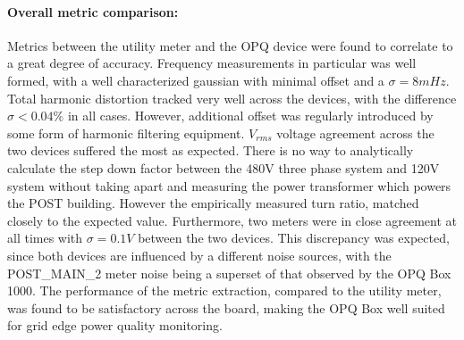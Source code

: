 \paragraph{Overall metric comparison:}
Metrics between the utility meter and the OPQ device were found to correlate to a great degree of accuracy.
Frequency measurements in particular was well formed, with a well characterized gaussian with minimal offset and a $\sigma =8mHz$.
Total harmonic distortion tracked very well across the devices, with the difference $\sigma < 0.04\%$ in all cases.
However, additional offset was regularly introduced by some form of harmonic filtering equipment.
$V_{rms}$ voltage agreement across the two devices suffered the most as expected.
There is no way to analytically calculate the step down factor between the 480V three phase system and 120V system without taking apart and measuring the power transformer which powers the POST building.
However the empirically measured turn ratio, matched closely to the expected value.
Furthermore, two meters were in close agreement at all times with $\sigma =0.1V$ between the two devices.
This discrepancy was expected, since both devices are influenced by a different noise sources, with the POST\_MAIN\_2 meter noise being a superset of that observed by the OPQ Box 1000.
The performance of the metric extraction, compared to the utility meter, was found to be satisfactory across the board, making the OPQ Box well suited for grid edge power quality monitoring.


